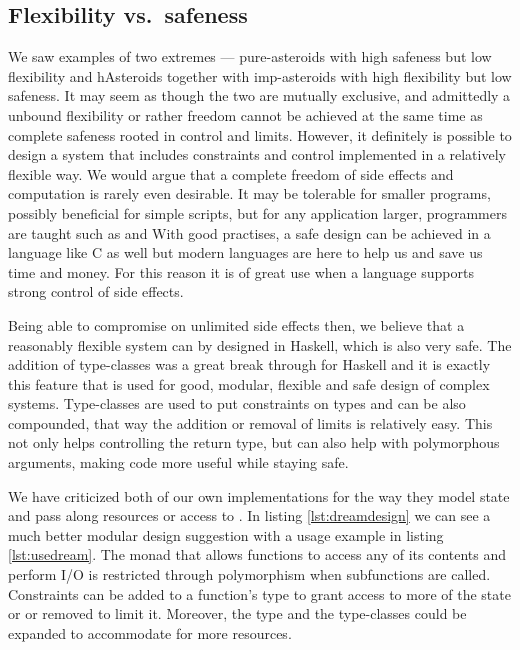 \documentclass[
  digital, %
  color,   %
  table,   %
  oneside, %
  lof,     %
  lot,     %
]{fithesis3}
\newcommand{\vs}{vs.\ }
\begin{document}
{\subsection{Flexibility \vs safeness}
We saw examples of two extremes --- pure-asteroids with high safeness but low flexibility
and hAsteroids together with imp-asteroids with high flexibility but low safeness.
It may seem as though the two are mutually exclusive, and admittedly a unbound flexibility
or rather freedom cannot be achieved at the same time as complete safeness rooted in control
and limits. However, it definitely is possible to design a system that includes
constraints and control implemented in a relatively flexible way. We would argue that
a complete freedom of side effects and computation is rarely even desirable.
It may be tolerable for smaller programs, possibly beneficial for simple scripts,
but for any application larger, programmers are taught  such as
 and 
With good practises, a safe design can be achieved in a language like C as well
but modern languages are here to help us and save us time and money.
For this reason it is of great use when a language supports strong control
of side effects.

Being able to compromise on unlimited side effects then, we believe that a reasonably flexible
system can by designed in Haskell, which is also very safe.
The addition of type-classes was a great break through for Haskell and it is exactly this
feature that is used for good, modular, flexible and safe design of complex systems.
Type-classes are used to put constraints on types and can be also compounded,
that way the addition or removal of limits is relatively easy.
This not only helps controlling the return type, but can also help
with polymorphous arguments, making code more useful while staying safe.

We have criticized both of our own implementations for the way they model state
and pass along resources or access to . In listing \ref{lst:dreamdesign}
we can see a much better modular design suggestion with a usage example in listing \ref{lst:usedream}.
The monad that allows functions to access any of its contents and perform I/O
is restricted through polymorphism when subfunctions are called.
Constraints can be added to a function's type to grant access to more of the state or
or removed to limit it. Moreover, the  type and the type-classes
could be expanded to accommodate for more resources.

}
\end{document}
